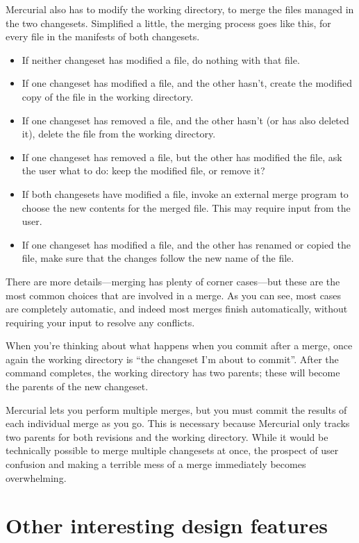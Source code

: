 Mercurial also has to modify the working directory, to merge the files
managed in the two changesets.  Simplified a little, the merging
process goes like this, for every file in the manifests of both
changesets.
\begin{itemize}
\item If neither changeset has modified a file, do nothing with that
  file.
\item If one changeset has modified a file, and the other hasn't,
  create the modified copy of the file in the working directory.
\item If one changeset has removed a file, and the other hasn't (or
  has also deleted it), delete the file from the working directory.
\item If one changeset has removed a file, but the other has modified
  the file, ask the user what to do: keep the modified file, or remove
  it?
\item If both changesets have modified a file, invoke an external
  merge program to choose the new contents for the merged file.  This
  may require input from the user.
\item If one changeset has modified a file, and the other has renamed
  or copied the file, make sure that the changes follow the new name
  of the file.
\end{itemize}
There are more details---merging has plenty of corner cases---but
these are the most common choices that are involved in a merge.  As
you can see, most cases are completely automatic, and indeed most
merges finish automatically, without requiring your input to resolve
any conflicts.

When you're thinking about what happens when you commit after a merge,
once again the working directory is ``the changeset I'm about to
commit''.  After the  command completes, the working
directory has two parents; these will become the parents of the new
changeset.

Mercurial lets you perform multiple merges, but you must commit the
results of each individual merge as you go.  This is necessary because
Mercurial only tracks two parents for both revisions and the working
directory.  While it would be technically possible to merge multiple
changesets at once, the prospect of user confusion and making a
terrible mess of a merge immediately becomes overwhelming.

\section{Other interesting design features}

